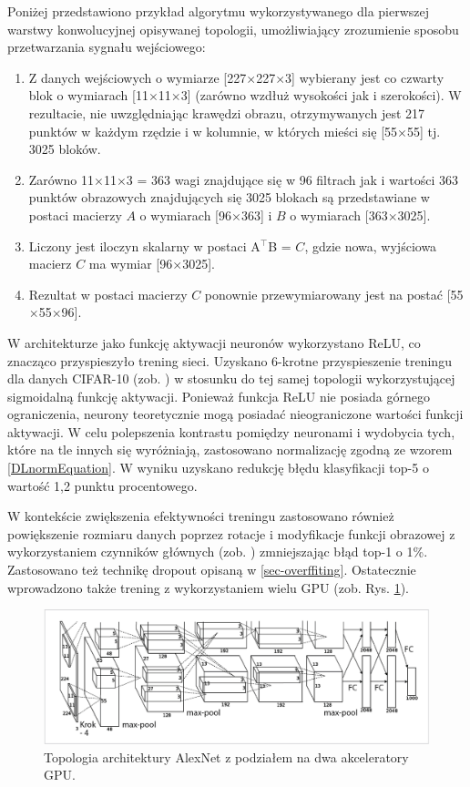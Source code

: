 Poniżej przedstawiono przykład algorytmu wykorzystywanego dla pierwszej warstwy konwolucyjnej opisywanej topologii, umożliwiający zrozumienie sposobu przetwarzania sygnału wejściowego: 
\begin{enumerate}
\item Z danych wejściowych o wymiarze [227$\times$227$\times$3] wybierany jest co czwarty blok  o wymiarach [11$\times$11$\times$3] (zarówno wzdłuż wysokości jak i szerokości). W rezultacie, nie uwzględniając krawędzi obrazu, otrzymywanych jest 217 punktów w każdym rzędzie i w kolumnie, w których mieści się [55$\times$55] tj. 3025 bloków.
\item Zarówno 11$\times$11$\times$3 = 363 wagi znajdujące się w 96 filtrach jak i wartości 363 punktów obrazowych znajdujących się 3025 blokach są przedstawiane w postaci macierzy $A$ o wymiarach [96$\times$363] i $B$ o wymiarach [363$\times$3025].
\item Liczony jest iloczyn skalarny w postaci A$^\intercal$B = $C$, gdzie nowa, wyjściowa macierz $C$ ma wymiar [96$\times$3025].
\item Rezultat w postaci macierzy $C$ ponownie przewymiarowany jest na postać [55$\times$55$\times$96].  
\end{enumerate} 

W architekturze jako funkcję aktywacji neuronów wykorzystano ReLU, co znacząco przyspieszyło trening sieci. Uzyskano 6-krotne przyspieszenie treningu dla danych CIFAR-10 (zob. \cite{CIFAR}) w stosunku do tej samej topologii wykorzystującej sigmoidalną funkcję aktywacji. Ponieważ funkcja ReLU nie posiada górnego ograniczenia, neurony teoretycznie mogą posiadać nieograniczone wartości funkcji aktywacji. W celu polepszenia kontrastu pomiędzy neuronami i wydobycia tych, które na tle innych się wyróżniają, zastosowano normalizację zgodną ze wzorem \ref{DLnormEquation}. W wyniku uzyskano redukcję błędu klasyfikacji top-5 o wartość 1,2 punktu procentowego.

W kontekście zwiększenia efektywności treningu zastosowano również powiększenie rozmiaru danych poprzez rotacje i modyfikacje funkcji obrazowej z wykorzystaniem czynników głównych (zob. \cite{Krizhevsky2012}) zmniejszając błąd top-1 o 1\%. Zastosowano też technikę dropout opisaną w \ref{sec-overffiting}. Ostatecznie wprowadzono także trening z wykorzystaniem wielu GPU (zob. Rys. \ref{AlexNetTopologyMultiGPU}). 

\begin{figure}[h!]
	\centering
	\includegraphics[width=1\textwidth]{figures/AlexNet-multiGPU.png}
	\caption{Topologia architektury AlexNet z podziałem na dwa akceleratory GPU.}
	\label{AlexNetTopologyMultiGPU}
\end{figure}


